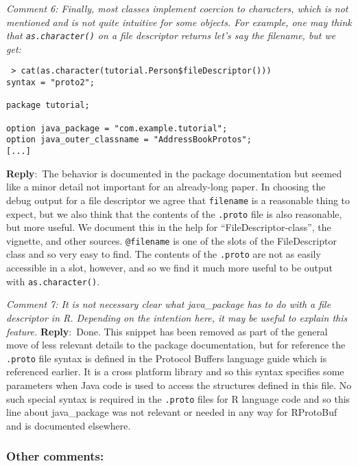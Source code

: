 \documentclass[10pt]{article}
\newcommand{\pointRaised}[2]{\smallskip %
  \textsl{{\fontseries{b}\selectfont #1}: #2}\newline}
\newcommand{\reply}[1]{\textbf{Reply}:\ #1 \smallskip } %
\begin{document}
\pointRaised{Comment 6}{Finally, most classes implement coercion to characters, which is not 
  mentioned and is not quite intuitive for some objects. For example, one
  may think that \texttt{as.character()} on a file descriptor returns let's say the 
  filename, but we get:}

\begin{verbatim}
 > cat(as.character(tutorial.Person$fileDescriptor()))
syntax = "proto2";

package tutorial;

option java_package = "com.example.tutorial";
option java_outer_classname = "AddressBookProtos";
[...]
\end{verbatim}
\reply{The behavior is documented in the package documentation but
  seemed like a minor detail not important for an already-long paper.
  In choosing the debug output for a file descriptor we agree
  that \texttt{filename} is a reasonable thing to expect, but we also
  think that the contents of the \texttt{.proto} file is also
  reasonable, but more useful.  We document this in the help for
  ``FileDescriptor-class'', the vignette, and other sources.
  \texttt{@filename} is one of the slots of the FileDescriptor class
  and so very easy to find.  The contents of the \texttt{.proto} are
  not as easily accessible in a slot, however, and so we find it much
  more useful to be output with \texttt{as.character()}.}

\pointRaised{Comment 7}{It is not necessary clear what java\_package has to do with a file 
  descriptor in R. Depending on the intention here, it may be useful to 
  explain this feature.
}
\reply{Done. This snippet has been removed as part of the general move of
  less relevant details to the package documentation, but for
  reference the \texttt{.proto} file syntax is defined in the Protocol Buffers
  language guide which is referenced earlier. It is a cross platform
  library and so this syntax specifies some parameters when Java code
  is used to access the structures defined in this file.  No such
  special syntax is required in the \texttt{.proto} files for R
  language code and so this line about java\_package was not relevant
  or needed in any way for RProtoBuf and is documented elsewhere.}

\subsubsection*{Other comments:}
\end{document}
